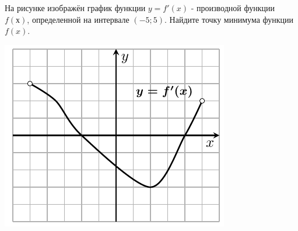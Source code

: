 \begin{ex}
	\begin{condition}
		\begin{minipage}[t]{0.67\textwidth}
			На рисунке изображён график функции \( y = f'(x) \) - производной функции
			\( f(х) \), определенной на интервале \( ( -5; 5) \). Найдите точку минимума функции \( f(x) \).
		\end{minipage}
		\begin{minipage}[c]{0.25\textwidth}
			\includegraphics[align=t, width=\textwidth]{graphs/graph_0/graph_0}
		\end{minipage}
	\end{condition}
\end{ex}